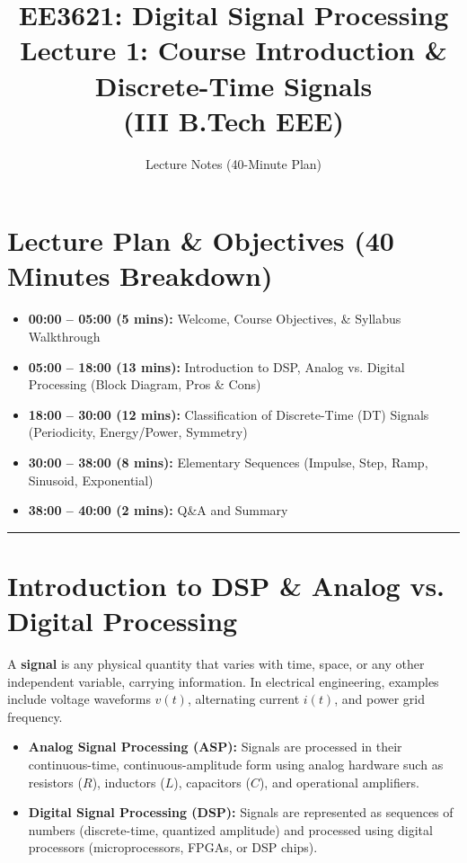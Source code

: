 \documentclass[11pt,a4paper]{article}
\title{\textbf{EE3621: Digital Signal Processing} \\ \Large Lecture 1: Course Introduction \& Discrete-Time Signals \\ \large (III B.Tech EEE)}
\author{Lecture Notes (40-Minute Plan)}
\date{}
\begin{document}
\maketitle

\section{Lecture Plan \& Objectives (40 Minutes Breakdown)}
\begin{itemize}
    \item \textbf{00:00 -- 05:00 (5 mins):} Welcome, Course Objectives, \& Syllabus Walkthrough
    \item \textbf{05:00 -- 18:00 (13 mins):} Introduction to DSP, Analog vs. Digital Processing (Block Diagram, Pros \& Cons)
    \item \textbf{18:00 -- 30:00 (12 mins):} Classification of Discrete-Time (DT) Signals (Periodicity, Energy/Power, Symmetry)
    \item \textbf{30:00 -- 38:00 (8 mins):} Elementary Sequences (Impulse, Step, Ramp, Sinusoid, Exponential)
    \item \textbf{38:00 -- 40:00 (2 mins):} Q\&A and Summary
\end{itemize}

\noindent\rule{\textwidth}{0.5pt}

\section{Introduction to DSP \& Analog vs. Digital Processing}

A \textbf{signal} is any physical quantity that varies with time, space, or any other independent variable, carrying information. In electrical engineering, examples include voltage waveforms $v(t)$, alternating current $i(t)$, and power grid frequency.

\begin{itemize}
    \item \textbf{Analog Signal Processing (ASP):} Signals are processed in their continuous-time, continuous-amplitude form using analog hardware such as resistors ($R$), inductors ($L$), capacitors ($C$), and operational amplifiers.
    \item \textbf{Digital Signal Processing (DSP):} Signals are represented as sequences of numbers (discrete-time, quantized amplitude) and processed using digital processors (microprocessors, FPGAs, or DSP chips).
\end{itemize}
\end{document}
